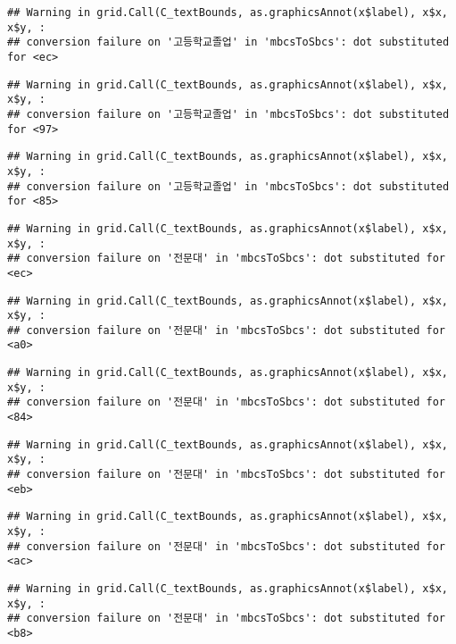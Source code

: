\documentclass[
]{article}
\begin{document}
\begin{verbatim}
## Warning in grid.Call(C_textBounds, as.graphicsAnnot(x$label), x$x, x$y, :
## conversion failure on '고등학교졸업' in 'mbcsToSbcs': dot substituted for <ec>
\end{verbatim}

\begin{verbatim}
## Warning in grid.Call(C_textBounds, as.graphicsAnnot(x$label), x$x, x$y, :
## conversion failure on '고등학교졸업' in 'mbcsToSbcs': dot substituted for <97>
\end{verbatim}

\begin{verbatim}
## Warning in grid.Call(C_textBounds, as.graphicsAnnot(x$label), x$x, x$y, :
## conversion failure on '고등학교졸업' in 'mbcsToSbcs': dot substituted for <85>
\end{verbatim}

\begin{verbatim}
## Warning in grid.Call(C_textBounds, as.graphicsAnnot(x$label), x$x, x$y, :
## conversion failure on '전문대' in 'mbcsToSbcs': dot substituted for <ec>
\end{verbatim}

\begin{verbatim}
## Warning in grid.Call(C_textBounds, as.graphicsAnnot(x$label), x$x, x$y, :
## conversion failure on '전문대' in 'mbcsToSbcs': dot substituted for <a0>
\end{verbatim}

\begin{verbatim}
## Warning in grid.Call(C_textBounds, as.graphicsAnnot(x$label), x$x, x$y, :
## conversion failure on '전문대' in 'mbcsToSbcs': dot substituted for <84>
\end{verbatim}

\begin{verbatim}
## Warning in grid.Call(C_textBounds, as.graphicsAnnot(x$label), x$x, x$y, :
## conversion failure on '전문대' in 'mbcsToSbcs': dot substituted for <eb>
\end{verbatim}

\begin{verbatim}
## Warning in grid.Call(C_textBounds, as.graphicsAnnot(x$label), x$x, x$y, :
## conversion failure on '전문대' in 'mbcsToSbcs': dot substituted for <ac>
\end{verbatim}

\begin{verbatim}
## Warning in grid.Call(C_textBounds, as.graphicsAnnot(x$label), x$x, x$y, :
## conversion failure on '전문대' in 'mbcsToSbcs': dot substituted for <b8>
\end{verbatim}
\end{document}
